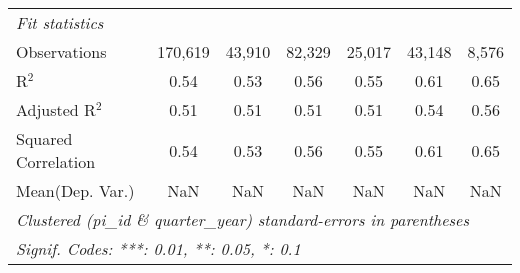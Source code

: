\begin{tabular}{lcccccc}
   \midrule
   \emph{Fit statistics}\\
   Observations                                               & 170,619      & 43,910        & 82,329       & 25,017       & 43,148       & 8,576\\  
   R$^2$                                                      & 0.54         & 0.53          & 0.56         & 0.55         & 0.61         & 0.65\\  
   Adjusted R$^2$                                             & 0.51         & 0.51          & 0.51         & 0.51         & 0.54         & 0.56\\  
   Squared Correlation                                        & 0.54         & 0.53          & 0.56         & 0.55         & 0.61         & 0.65\\  
Mean(Dep. Var.) & NaN & NaN & NaN & NaN & NaN & NaN \\
   \midrule \midrule
   \multicolumn{7}{l}{\emph{Clustered (pi\_id \& quarter\_year) standard-errors in parentheses}}\\
   \multicolumn{7}{l}{\emph{Signif. Codes: ***: 0.01, **: 0.05, *: 0.1}}\\
\end{tabular}
\par\endgroup
